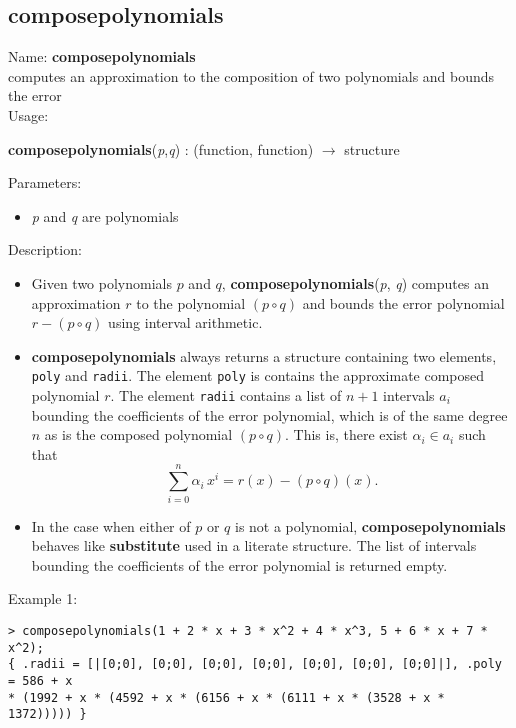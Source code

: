 \subsection{composepolynomials}
\label{labcomposepolynomials}
\noindent Name: \textbf{composepolynomials}\\
computes an approximation to the composition of two polynomials and bounds the error\\
\noindent Usage: 
\begin{center}
\textbf{composepolynomials}(\emph{p},\emph{q}) : (\textsf{function}, \textsf{function}) $\rightarrow$ \textsf{structure}\\
\end{center}
Parameters: 
\begin{itemize}
\item \emph{p} and \emph{q} are polynomials
\end{itemize}
\noindent Description: \begin{itemize}

\item Given two polynomials $p$ and $q$, \textbf{composepolynomials}(\emph{p}, \emph{q}) computes an 
   approximation $r$ to the polynomial $(p \circ q)$ and bounds the
   error polynomial $r - (p \circ q)$ using interval arithmetic.

\item \textbf{composepolynomials} always returns a structure containing two elements,
   \texttt{poly} and \texttt{radii}.  The element
   \texttt{poly} is contains the approximate composed polynomial
   $r$. The element \texttt{radii} contains a list of $n + 1$ 
   intervals $a_i$ bounding the coefficients of the
   error polynomial, which is of the same degree $n$ as is the
   composed polynomial $(p \circ q)$.  This is, there exist
   $\alpha_i \in a_i$ such that 
   $$\sum\limits_{i=0}^n \alpha_i \, x^i = r(x) - (p \circ q)(x).$$

\item In the case when either of $p$ or $q$ is not a polynomial, \textbf{composepolynomials}
   behaves like \textbf{substitute} used in a literate structure. The list of intervals
   bounding the coefficients of the error polynomial is returned empty.
\end{itemize}
\noindent Example 1: 
\begin{center}\begin{minipage}{15cm}\begin{Verbatim}[frame=single]
> composepolynomials(1 + 2 * x + 3 * x^2 + 4 * x^3, 5 + 6 * x + 7 * x^2);
{ .radii = [|[0;0], [0;0], [0;0], [0;0], [0;0], [0;0], [0;0]|], .poly = 586 + x 
* (1992 + x * (4592 + x * (6156 + x * (6111 + x * (3528 + x * 1372))))) }
\end{Verbatim}
\end{minipage}\end{center}
